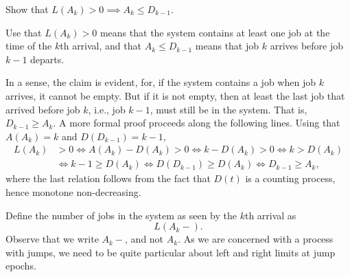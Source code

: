 \begin{extra} Show that $L(A_k)>0 \implies A_k \leq D_{k-1}$.
\begin{hint} Use that $L(A_k)>0$ means that the system contains at least one job at the time of the $k$th arrival, and that $A_k \leq D_{k-1}$ means that job $k$ arrives before job $k-1$ departs.
\end{hint}
\begin{solution} In a sense, the claim is evident, for, if the system contains a job when job $k$ arrives, it cannot be empty.
 But if it is not empty, then at least the last job that arrived before job $k$, i.e., job $k-1$, must still be in the system.
 That is, $D_{k-1} \geq A_k$.
 A more formal proof proceeds along the following lines.
 Using that $A(A_k) = k$ and $D(D_{k-1})= k-1$,
 \begin{equation*}
 \begin{split}
 L(A_k) &> 0 \Leftrightarrow A(A_k) - D(A_k) > 0 \Leftrightarrow k - D(A_k) > 0 \Leftrightarrow k > D(A_k) \\
 &\Leftrightarrow k-1 \geq D(A_k) \Leftrightarrow D(D_{k-1}) \geq D(A_k) \Leftrightarrow D_{k-1} \geq A_k, 
 \end{split}
 \end{equation*}
 where the last relation follows from the fact that $D(t)$ is a
 counting process, hence monotone non-decreasing.
\end{solution}
\end{extra}

Define the number of jobs in the system as seen by the $k$th arrival as
\begin{equation}
 \label{eq:Lk}
 L(A_k-).
\end{equation}
Observe that we write $A_k-$, and not $A_k$.
As we are concerned with a process with jumps, we need to be quite particular about left and right limits at jump epochs.


